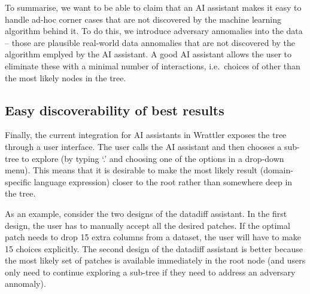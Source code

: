 \documentclass{article}
\begin{document}
To summarise, we want to be able to claim that an AI assistant makes it easy to handle ad-hoc
corner cases that are not discovered by the machine learning algorithm behind it. To do this,
we introduce adversary annomalies into the data -- those are plausible real-world data annomalies 
that are not discovered by the algorithm emplyed by the AI assistant. A good AI assistant allows
the user to eliminate these with a minimal number of interactions, i.e.~choices of other than
the most likely nodes in the tree. 

\subsection{Easy discoverability of best results}

Finally, the current integration for AI assistants in Wrattler exposes the tree through a
user interface. The user calls the AI assistant and then chooses a sub-tree to explore 
(by typing `.' and choosing one of the options in a drop-down menu). This means that it is
desirable to make the most likely result (domain-specific language expression) closer to the
root rather than somewhere deep in the tree.

As an example, consider the two designs of the datadiff assistant. In the first design, the
user has to manually accept all the desired patches. If the optimal patch needs to drop 15
extra columns from a dataset, the user will have to make 15 choices explicitly. The
second design of the datadiff assistant is better because the most likely set of patches
is available immediately in the root node (and users only need to continue exploring a
sub-tree if they need to address an adversary annomaly).
\end{document}
